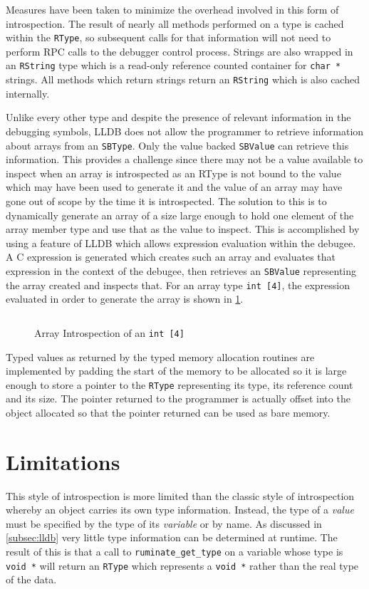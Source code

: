 \documentclass{report}
\begin{document}
Measures have been taken to minimize the overhead involved in this form of
introspection. The result of nearly all methods performed on a type is cached
within the \lstinline|RType|, so subsequent calls for that information will not
need to perform RPC calls to the debugger control process. Strings are also
wrapped in an \lstinline|RString| type which is a read-only reference counted
container for \lstinline|char *| strings. All methods which return strings
return an \lstinline|RString| which is also cached internally.

Unlike every other type and despite the presence of relevant information in the
debugging symbols, LLDB does not allow the programmer to retrieve information
about arrays from an \lstinline|SBType|. Only the value backed
\lstinline|SBValue| can retrieve this information. This provides a challenge
since there may not be a value available to inspect when an array is
introspected as an RType is not bound to the value which may have been used to
generate it and the value of an array may have gone out of scope by the time it
is introspected. The solution to this is to dynamically generate an array of a
size large enough to hold one element of the array member type and use that as
the value to inspect. This is accomplished by using a feature of LLDB which
allows expression evaluation within the debugee. A C expression is generated
which creates such an array and evaluates that expression in the context of the
debugee, then retrieves an \lstinline|SBValue| representing the array created
and inspects that. For an array type \lstinline|int [4]|, the expression
evaluated in order to generate the array is shown in
\cref{fig:array_introspect}.

\begin{figure}
	\inputminted[tabsize=2]{c}{array_introspection.c}
	\caption{Array Introspection of an \lstinline|int [4]|}
	\label{fig:array_introspect}
\end{figure}

Typed values as returned by the typed memory allocation routines are implemented
by padding the start of the memory to be allocated so it is large enough to
store a pointer to the \lstinline|RType| representing its type, its reference
count and its size. The pointer returned to the programmer is actually offset
into the object allocated so that the pointer returned can be used as bare
memory.

\section{Limitations}
\label{sec:limitations}
This style of introspection is more limited than the classic style of
introspection whereby an object carries its own type information. Instead, the
type of a \emph{value} must be specified by the type of its \emph{variable} or
by name. As discussed in \cref{subsec:lldb} very little type information can be
determined at runtime. The result of this is that a call to
\lstinline|ruminate_get_type| on a variable whose type is \lstinline|void *|
will return an \lstinline|RType| which represents a \lstinline|void *| rather
than the real type of the data.
\end{document}
